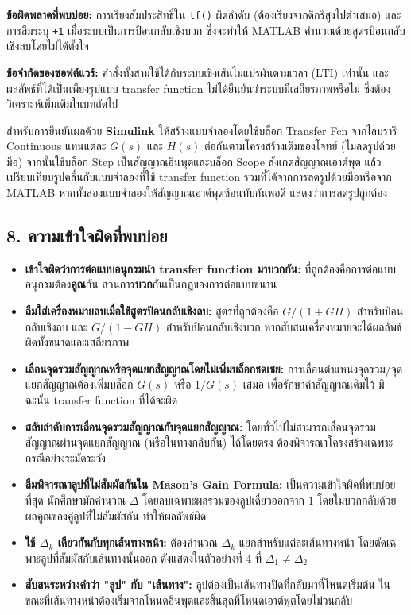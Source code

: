 \textbf{ข้อผิดพลาดที่พบบ่อย:} การเรียงสัมประสิทธิ์ใน \texttt{tf()} ผิดลำดับ (ต้องเรียงจากดีกรีสูงไปต่ำเสมอ) และการลืมระบุ \texttt{+1} เมื่อระบบเป็นการป้อนกลับเชิงบวก ซึ่งจะทำให้ MATLAB คำนวณด้วยสูตรป้อนกลับเชิงลบโดยไม่ได้ตั้งใจ

\textbf{ข้อจำกัดของซอฟต์แวร์:} คำสั่งทั้งสามใช้ได้กับระบบเชิงเส้นไม่แปรผันตามเวลา (LTI) เท่านั้น และผลลัพธ์ที่ได้เป็นเพียงรูปแบบ transfer function ไม่ได้ยืนยันว่าระบบมีเสถียรภาพหรือไม่ ซึ่งต้องวิเคราะห์เพิ่มเติมในบทถัดไป

สำหรับการยืนยันผลด้วย \textbf{Simulink} ให้สร้างแบบจำลองโดยใช้บล็อก Transfer Fcn จากไลบรารี Continuous แทนแต่ละ $G(s)$ และ $H(s)$ ต่อกันตามโครงสร้างเดิมของโจทย์ (ไม่ลดรูปด้วยมือ) จากนั้นใช้บล็อก Step เป็นสัญญาณอินพุตและบล็อก Scope สังเกตสัญญาณเอาต์พุต แล้วเปรียบเทียบรูปคลื่นกับแบบจำลองที่ใช้ transfer function รวมที่ได้จากการลดรูปด้วยมือหรือจาก MATLAB หากทั้งสองแบบจำลองให้สัญญาณเอาต์พุตซ้อนทับกันพอดี แสดงว่าการลดรูปถูกต้อง

\newpage

\subsection{8. ความเข้าใจผิดที่พบบ่อย}

\begin{itemize}
    \item \textbf{เข้าใจผิดว่าการต่อแบบอนุกรมนำ transfer function มาบวกกัน:} ที่ถูกต้องคือการต่อแบบอนุกรมต้อง\textbf{คูณ}กัน ส่วนการ\textbf{บวก}กันเป็นกฎของการต่อแบบขนาน
    \item \textbf{ลืมใส่เครื่องหมายลบเมื่อใช้สูตรป้อนกลับเชิงลบ:} สูตรที่ถูกต้องคือ $G/(1+GH)$ สำหรับป้อนกลับเชิงลบ และ $G/(1-GH)$ สำหรับป้อนกลับเชิงบวก หากสับสนเครื่องหมายจะได้ผลลัพธ์ผิดทั้งขนาดและเสถียรภาพ
    \item \textbf{เลื่อนจุดรวมสัญญาณหรือจุดแยกสัญญาณโดยไม่เพิ่มบล็อกชดเชย:} การเลื่อนตำแหน่งจุดรวม/จุดแยกสัญญาณต้องเพิ่มบล็อก $G(s)$ หรือ $1/G(s)$ เสมอ เพื่อรักษาค่าสัญญาณเดิมไว้ มิฉะนั้น transfer function ที่ได้จะผิด
    \item \textbf{สลับลำดับการเลื่อนจุดรวมสัญญาณกับจุดแยกสัญญาณ:} โดยทั่วไปไม่สามารถเลื่อนจุดรวมสัญญาณผ่านจุดแยกสัญญาณ (หรือในทางกลับกัน) ได้โดยตรง ต้องพิจารณาโครงสร้างเฉพาะกรณีอย่างระมัดระวัง
    \item \textbf{ลืมพิจารณาลูปที่ไม่สัมผัสกันใน Mason's Gain Formula:} เป็นความเข้าใจผิดที่พบบ่อยที่สุด นักศึกษามักคำนวณ $\Delta$ โดยลบเฉพาะผลรวมของลูปเดี่ยวออกจาก 1 โดยไม่บวกกลับด้วยผลคูณของคู่ลูปที่ไม่สัมผัสกัน ทำให้ผลลัพธ์ผิด
    \item \textbf{ใช้ $\Delta_k$ เดียวกันกับทุกเส้นทางหน้า:} ต้องคำนวณ $\Delta_k$ แยกสำหรับแต่ละเส้นทางหน้า โดยตัดเฉพาะลูปที่สัมผัสกับเส้นทางนั้นออก ดังแสดงในตัวอย่างที่ 4 ที่ $\Delta_1 \neq \Delta_2$
    \item \textbf{สับสนระหว่างคำว่า "ลูป" กับ "เส้นทาง":} ลูปต้องเป็นเส้นทางปิดที่กลับมาที่โหนดเริ่มต้น ในขณะที่เส้นทางหน้าต้องเริ่มจากโหนดอินพุตและสิ้นสุดที่โหนดเอาต์พุตโดยไม่วนกลับ
\end{itemize}

